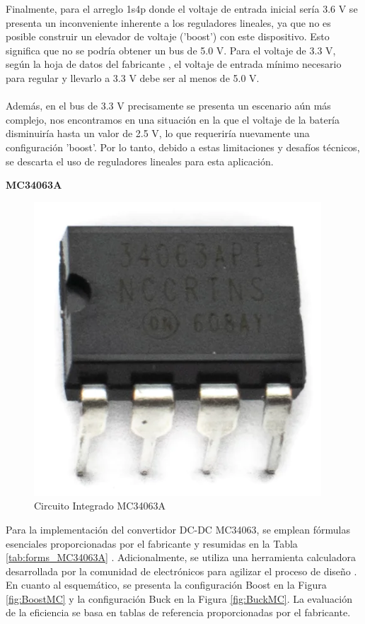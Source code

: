 Finalmente, para el arreglo 1s4p donde el voltaje de entrada inicial sería 3.6 V se presenta un inconveniente inherente a los reguladores lineales, ya que no es posible construir un elevador de voltaje ('boost') con este dispositivo. Esto significa que no se podría obtener un bus de 5.0 V. Para el voltaje de 3.3 V, según la hoja de datos del fabricante \cite{analog_lt1117fd}, el voltaje de entrada mínimo necesario para regular y llevarlo a 3.3 V debe ser al menos de 5.0 V. \\\\Además, en el bus de 3.3 V precisamente se presenta un escenario aún más complejo, nos encontramos en una situación en la que el voltaje de la batería disminuiría hasta un valor de 2.5 V, lo que requeriría nuevamente una configuración 'boost'. Por lo tanto, debido a estas limitaciones y desafíos técnicos, se descarta el uso de reguladores lineales para esta aplicación.
\newpage

\textbf{MC34063A}

\begin{figure}[h]
  \centering
  \includegraphics[width=0.25\linewidth]{Pictures/MC34063_IC.png} 
  \caption{Circuito Integrado MC34063A}
  \label{fig:MC34063_IC}
\end{figure}

Para la implementación del convertidor DC-DC MC34063, se emplean fórmulas esenciales proporcionadas por el fabricante y resumidas en la Tabla \ref{tab:forms_MC34063A} \cite{ti_mc34063a}. Adicionalmente, se utiliza una herramienta calculadora desarrollada por la comunidad de electrónicos para agilizar el proceso de diseño \cite{nomad_ee_mc34063a}. En cuanto al esquemático, se presenta la configuración Boost en la Figura \ref{fig:BoostMC} y la configuración Buck en la Figura \ref{fig:BuckMC}. La evaluación de la eficiencia se basa en tablas de referencia proporcionadas por el fabricante.

